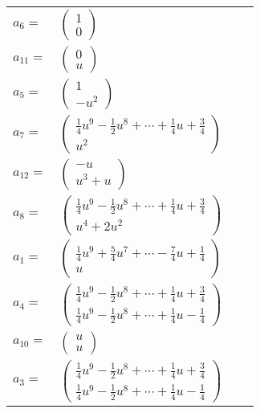 \documentclass[1p]{elsarticle_modified}
\theoremstyle{definition}
\begin{document}
\begin{tabular}{m{7pt} m{180pt} m{7pt} m{180pt} }
\flushright $a_{6}=$&$\begin{pmatrix}1\\0\end{pmatrix}$ \\
\flushright $a_{11}=$&$\begin{pmatrix}0\\u\end{pmatrix}$ \\
\flushright $a_{5}=$&$\begin{pmatrix}1\\- u^2\end{pmatrix}$ \\
\flushright $a_{7}=$&$\begin{pmatrix}\frac{1}{4} u^9-\frac{1}{2} u^8+\cdots+\frac{1}{4} u+\frac{3}{4}\\u^2\end{pmatrix}$ \\
\flushright $a_{12}=$&$\begin{pmatrix}- u\\u^3+u\end{pmatrix}$ \\
\flushright $a_{8}=$&$\begin{pmatrix}\frac{1}{4} u^9-\frac{1}{2} u^8+\cdots+\frac{1}{4} u+\frac{3}{4}\\u^4+2 u^2\end{pmatrix}$ \\
\flushright $a_{1}=$&$\begin{pmatrix}\frac{1}{4} u^9+\frac{5}{4} u^7+\cdots-\frac{7}{4} u+\frac{1}{4}\\u\end{pmatrix}$ \\
\flushright $a_{4}=$&$\begin{pmatrix}\frac{1}{4} u^9-\frac{1}{2} u^8+\cdots+\frac{1}{4} u+\frac{3}{4}\\\frac{1}{4} u^9-\frac{1}{2} u^8+\cdots+\frac{1}{4} u-\frac{1}{4}\end{pmatrix}$ \\
\flushright $a_{10}=$&$\begin{pmatrix}u\\u\end{pmatrix}$ \\
\flushright $a_{3}=$&$\begin{pmatrix}\frac{1}{4} u^9-\frac{1}{2} u^8+\cdots+\frac{1}{4} u+\frac{3}{4}\\\frac{1}{4} u^9-\frac{1}{2} u^8+\cdots+\frac{1}{4} u-\frac{1}{4}\end{pmatrix}$ \\

\end{tabular}
\end{document}
